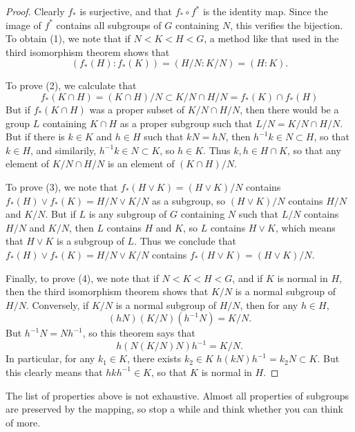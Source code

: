 \begin{proof}
    Clearly $f_*$ is surjective, and that $f_* \circ f^*$ is the identity map. Since the image of $f^*$ contains all subgroups of $G$ containing $N$, this verifies the bijection. To obtain (1), we note that if $N < K < H < G$, a method like that used in the third isomorphism theorem shows that
    \[ (f_*(H): f_*(K)) = (H/N: K/N) = (H:K). \]

    To prove (2), we calculate that
    \[ f_*(K \cap H) = (K \cap H)/N \subset K/N \cap H/N = f_*(K) \cap f_*(H) \]
    But if $f_*(K \cap H)$ was a proper subset of $K/N \cap H/N$, then there would be a group $L$ containing $K \cap H$ as a proper subgroup such that $L/N = K/N \cap H/N$. But if there is $k \in K$ and $h \in H$ such that $kN = hN$, then $h^{-1}k \in N \subset H$, so that $k \in H$, and similarily, $h^{-1}k \in N \subset K$, so $h \in K$. Thus $k,h \in H \cap K$, so that any element of $K/N \cap H/N$ is an element of $(K \cap H)/N$.

    To prove (3), we note that $f_*(H \vee K) = (H \vee K)/N$ contains $f_*(H) \vee f_*(K) = H/N \vee K/N$ as a subgroup, so $(H \vee K)/N$ contains $H/N$ and $K/N$. But if $L$ is any subgroup of $G$ containing $N$ such that $L/N$ contains $H/N$ and $K/N$, then $L$ contains $H$ and $K$, so $L$ contains $H \vee K$, which means that $H \vee K$ is a subgroup of $L$. Thus we conclude that $f_*(H) \vee f_*(K) = H/N \vee K/N$ contains $f_*(H \vee K) = (H \vee K)/N$.

    Finally, to prove (4), we note that if $N < K < H < G$, and if $K$ is normal in $H$, then the third isomorphism theorem shows that $K/N$ is a normal subgroup of $H/N$. Conversely, if $K/N$ is a normal subgroup of $H/N$, then for any $h \in H$,
    \[ (hN)(K/N)(h^{-1}N) = K/N. \]
    But $h^{-1}N = Nh^{-1}$, so this theorem says that
    \[ h(N(K/N)N)h^{-1} = K/N. \]
    In particular, for any $k_1 \in K$, there exists $k_2 \in K$ $h(kN)h^{-1} = k_2N \subset K$. But this clearly means that $hkh^{-1} \in K$, so that $K$ is normal in $H$.
\end{proof}

The list of properties above is not exhaustive. Almost all properties of subgroups are preserved by the mapping, so stop a while and think whether you can think of more.

